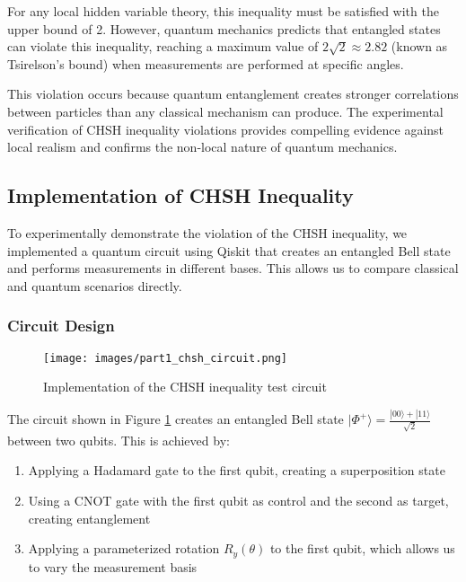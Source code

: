 \documentclass[12pt,a4paper]{article}
\begin{document}
For any local hidden variable theory, this inequality must be satisfied with the upper bound of 2. However, quantum mechanics predicts that entangled states can violate this inequality, reaching a maximum value of $2\sqrt{2} \approx 2.82$ (known as Tsirelson's bound) when measurements are performed at specific angles.

This violation occurs because quantum entanglement creates stronger correlations between particles than any classical mechanism can produce. The experimental verification of CHSH inequality violations provides compelling evidence against local realism and confirms the non-local nature of quantum mechanics.

\subsection{Implementation of CHSH Inequality}

To experimentally demonstrate the violation of the CHSH inequality, we implemented a quantum circuit using Qiskit that creates an entangled Bell state and performs measurements in different bases. This allows us to compare classical and quantum scenarios directly.

\subsubsection{Circuit Design}

\begin{figure}[h]
\centering
\texttt{[image: images/part1\_chsh\_circuit.png]}
\caption{Implementation of the CHSH inequality test circuit}
\label{fig:chsh_circuit}
\end{figure}

The circuit shown in Figure \ref{fig:chsh_circuit} creates an entangled Bell state $|\Phi^+\rangle = \frac{|00\rangle + |11\rangle}{\sqrt{2}}$ between two qubits. This is achieved by:

\begin{enumerate}
    \item Applying a Hadamard gate to the first qubit, creating a superposition state
    \item Using a CNOT gate with the first qubit as control and the second as target, creating entanglement
    \item Applying a parameterized rotation $R_y(\theta)$ to the first qubit, which allows us to vary the measurement basis
\end{enumerate}
\end{document}
